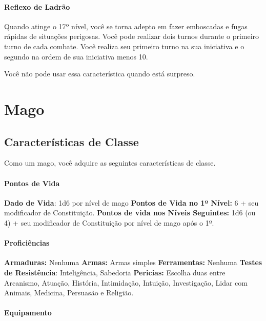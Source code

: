 \documentclass{RPG_Adventure}[2021/10/20]
\begin{document}
\subsubsection{Reflexo de Ladrão}%

Quando atinge o 17º nível, você se torna adepto em fazer emboscadas e fugas
rápidas de situações perigosas. Você pode realizar dois turnos durante o
primeiro turno de cada combate. Você realiza seu primeiro turno na sua
iniciativa e o segundo na ordem de sua iniciativa menos 10.

Você não pode usar essa característica quando está surpreso.


\chapter{Mago}%
\label{cha:mago}

\section*{Características de Classe}%

Como um mago, você adquire as seguintes características de classe.

\subsubsection{Pontos de Vida}%

\textbf{Dado de Vida}: 1d6 por nível de mago \nl
\textbf{Pontos de Vida no 1º Nível:} 6 + seu modificador de Constituição. \nl
\textbf{Pontos de vida nos Níveis Seguintes:} 1d6 (ou 4) + seu modificador de
Constituição por nível de mago após o 1º.

\subsubsection{Proficiências}%

\textbf{Armaduras:} Nenhuma \nl
\textbf{Armas:} Armas simples \nl
\textbf{Ferramentas:} Nenhuma \jump
\textbf{Testes de Resistência}: Inteligência, Sabedoria \nl
\textbf{Pericias:} Escolha duas entre Arcanismo, Atuação, História, Intimidação,
Intuição, Investigação, Lidar com Animais, Medicina, Persuasão e Religião.

\subsubsection{Equipamento}%
\end{document}
